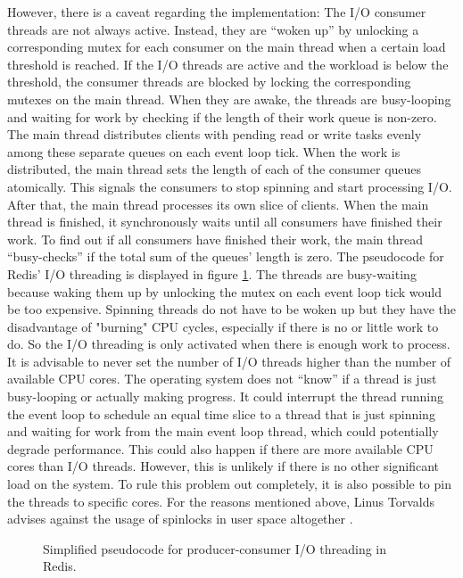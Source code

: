 However, there is a caveat regarding the implementation: The I/O consumer threads are not always active. Instead, they are “woken up” by unlocking a corresponding mutex for each consumer on the main thread when a certain load threshold is reached. If the I/O threads are active and the workload is below the threshold, the consumer threads are blocked by locking the corresponding mutexes on the main thread. When they are awake, the threads are busy-looping and waiting for work by checking if the length of their work queue is non-zero. The main thread distributes clients with pending read or write tasks evenly among these separate queues on each event loop tick. When the work is distributed, the main thread sets the length of each of the consumer queues atomically. This signals the consumers to stop spinning and start processing I/O. After that, the main thread processes its own slice of clients. When the main thread is finished, it synchronously waits until all consumers have finished their work. To find out if all consumers have finished their work, the main thread “busy-checks” if the total sum of the queues’ length is zero. The pseudocode for Redis’ I/O threading is displayed in figure \ref{fig:redisio_code}. The threads are busy-waiting because waking them up by unlocking the mutex on each event loop tick would be too expensive. Spinning threads do not have to be woken up but they have the disadvantage of "burning" CPU cycles, especially if there is no or little work to do. So the I/O threading is only activated when there is enough work to process. It is advisable to never set the number of I/O threads higher than the number of available CPU cores. The operating system does not “know” if a thread is just busy-looping or actually making progress. It could interrupt the thread running the event loop to schedule an equal time slice to a thread that is just spinning and waiting for work from the main event loop thread, which could potentially degrade performance. This could also happen if there are more available CPU cores than I/O threads. However, this is unlikely if there is no other significant load on the system. To rule this problem out completely, it is also possible to pin the threads to specific cores. For the reasons mentioned above, Linus Torvalds advises against the usage of spinlocks in user space altogether \cite{torvalds:spinlock}.
\begin{figure}
  \centering
  
  \caption{Simplified pseudocode for producer-consumer I/O threading in Redis.}
  \label{fig:redisio_code}
\end{figure}
\pagebreak
